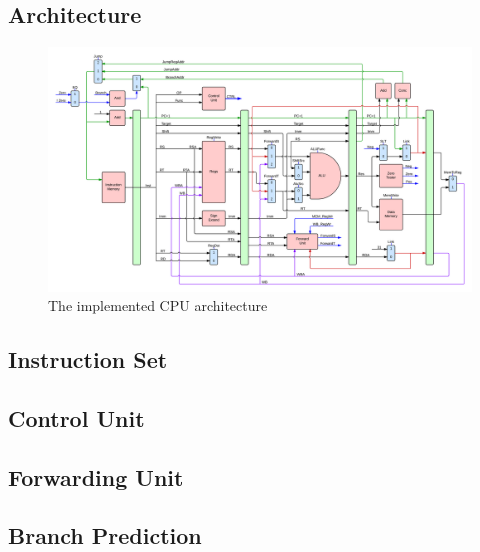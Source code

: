 \subsection{Architecture}

\begin{figure}[ht]
    \centering
    \includegraphics[scale=0.11]{figures/Architecture.png}
    \caption{\label{fig:cpuArchitecture}The implemented CPU architecture} 
\end{figure}

\subsection{Instruction Set}

\subsection{Control Unit}

\subsection{Forwarding Unit}

\subsection{Branch Prediction}

